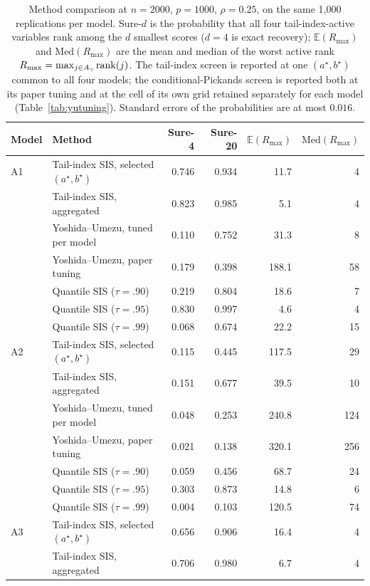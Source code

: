 \begin{table}[t]
\centering
\caption{Method comparison at $n=2000$, $p=1000$, $\rho=0.25$, on the same 1{,}000 replications per model. Sure-$d$ is the probability that all four tail-index-active variables rank among the $d$ smallest scores ($d=4$ is exact recovery); $\mathbb{E}(R_{\max})$ and $\mathrm{Med}(R_{\max})$ are the mean and median of the worst active rank $R_{\max}=\max_{j\in A_\gamma}\mathrm{rank}(j)$. The tail-index screen is reported at one $(a^\star,b^\star)$ common to all four models; the conditional-Pickands screen is reported both at its paper tuning and at the cell of its own grid retained separately for each model (Table~\ref{tab:yutuning}). Standard errors of the probabilities are at most $0.016$.}
\label{tab:cmp1000}
\begin{tabular}{llrrrr}
\toprule
Model & Method & Sure-4 & Sure-20 & $\mathbb{E}(R_{\max})$ & $\mathrm{Med}(R_{\max})$\\
\midrule
A1 & Tail-index SIS, selected $(a^\star,b^\star)$ & 0.746 & 0.934 & 11.7 & 4\\
 & Tail-index SIS, aggregated & 0.823 & 0.985 & 5.1 & 4\\
 & Yoshida--Umezu, tuned per model & 0.110 & 0.752 & 31.3 & 8\\
 & Yoshida--Umezu, paper tuning & 0.179 & 0.398 & 188.1 & 58\\
 & Quantile SIS ($\tau=.90$) & 0.219 & 0.804 & 18.6 & 7\\
 & Quantile SIS ($\tau=.95$) & 0.830 & 0.997 & 4.6 & 4\\
 & Quantile SIS ($\tau=.99$) & 0.068 & 0.674 & 22.2 & 15\\
\addlinespace
A2 & Tail-index SIS, selected $(a^\star,b^\star)$ & 0.115 & 0.445 & 117.5 & 29\\
 & Tail-index SIS, aggregated & 0.151 & 0.677 & 39.5 & 10\\
 & Yoshida--Umezu, tuned per model & 0.048 & 0.253 & 240.8 & 124\\
 & Yoshida--Umezu, paper tuning & 0.021 & 0.138 & 320.1 & 256\\
 & Quantile SIS ($\tau=.90$) & 0.059 & 0.456 & 68.7 & 24\\
 & Quantile SIS ($\tau=.95$) & 0.303 & 0.873 & 14.8 & 6\\
 & Quantile SIS ($\tau=.99$) & 0.004 & 0.103 & 120.5 & 74\\
\addlinespace
A3 & Tail-index SIS, selected $(a^\star,b^\star)$ & 0.656 & 0.906 & 16.4 & 4\\
 & Tail-index SIS, aggregated & 0.706 & 0.980 & 6.7 & 4\\

\end{tabular}
\end{table}
